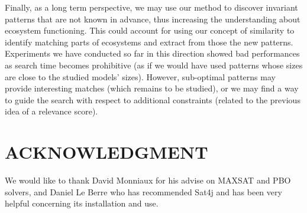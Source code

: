 \documentclass[a4paper,twoside]{article}
\begin{document}
Finally, as a long term perspective, we may use our method to discover invariant patterns that are not known in advance, thus increasing the  understanding about ecosystem functioning. This could account for using our concept of similarity to identify matching parts of ecosystems and extract from those the new patterns. Experiments we have conducted so far in this direction showed bad performances as search time becomes prohibitive (as if we would have used patterns whose sizes are close to the studied models' sizes). %
However, sub-optimal patterns may provide interesting matches (which remains to be studied), or we may find a way to guide the search with respect to additional constraints (related to the previous idea of a relevance score). 





\section*{\uppercase{Acknowledgment}}
We would like to thank David Monniaux for his advise on MAXSAT and
PBO solvers, and Daniel Le Berre who has recommended Sat4j and has
been very helpful concerning its installation and use.



\vfill

{\small

}
%
\end{document}
